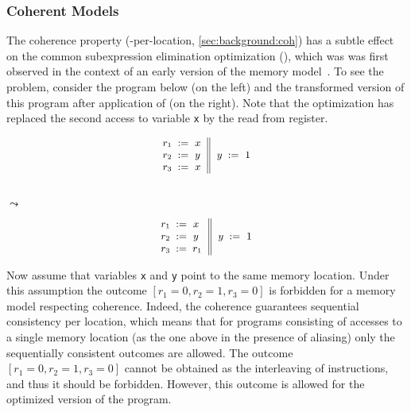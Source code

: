\subsubsection{Coherent Models}
\label{sec:analysis:coh}

The coherence property (\ie \SC-per-location, \cref{sec:background:coh})
has a subtle effect on the common subexpression elimination optimization (\CSE),
which was was first observed in the context of an early version of the \Java 
memory model~\cite{Pugh:JAVA99}.
To see the problem, consider the program below
(on the left) and the transformed version 
of this program after application of \CSE (on the right).
Note that the optimization has replaced 
the second access to variable \texttt{x}
by the read from register. 

\begin{minipage}{0.45\linewidth}
\begin{equation*}
\small
\inarrII{
  \readInst{}{r_1}{x}      \\
  \readInst{}{r_2}{y}      \\
  \readInst{}{r_3}{x}      \\
}{
  \writeInst{}{y}{1}       \\
}
\label{ex:coh-rr}
\end{equation*}
\end{minipage}\hfill%
\begin{minipage}{0.05\linewidth}
\Large~\\ $\leadsto$
\end{minipage}\hfill%
\begin{minipage}{0.45\linewidth}
\begin{equation*}
\small
\inarrII{
  \readInst{}{r_1}{x}      \\
  \readInst{}{r_2}{y}      \\
  \assignInst{r_3}{r_1}    \\
}{
  \writeInst{}{y}{1}       \\
}
\label{ex:coh-rr}
\end{equation*}
\end{minipage}

Now assume that variables \texttt{x} and \texttt{y} 
point to the same memory location.
Under this assumption the outcome $[r_1=0, r_2=1, r_3=0]$
is forbidden for a memory model respecting coherence.
Indeed, the coherence guarantees sequential consistency per location, 
which means that for programs consisting of accesses 
to a single memory location 
(as the one above in the presence of aliasing) 
only the sequentially consistent outcomes are allowed.
The outcome $[r_1=0, r_2=1, r_3=0]$ cannot be obtained 
as the interleaving of instructions, and thus 
it should be forbidden.  
However, this outcome is allowed for 
the optimized version of the program. 


